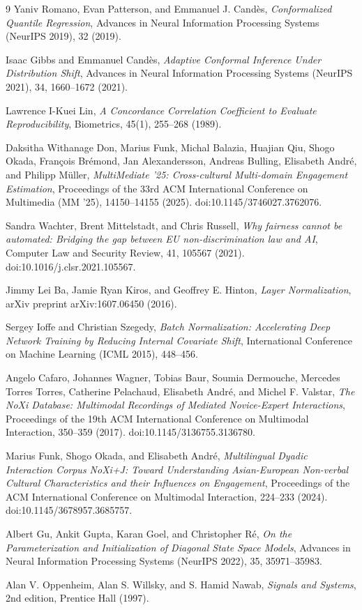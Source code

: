 \documentclass[11pt,a4paper]{article}
\begin{document}
\begin{thebibliography}{9}
		Yaniv Romano, Evan Patterson, and Emmanuel J. Candès, \emph{Conformalized Quantile Regression}, Advances in Neural Information Processing Systems (NeurIPS 2019), 32 (2019).
		
		Isaac Gibbs and Emmanuel Candès, \emph{Adaptive Conformal Inference Under Distribution Shift}, Advances in Neural Information Processing Systems (NeurIPS 2021), 34, 1660--1672 (2021).

		Lawrence I-Kuei Lin, \emph{A Concordance Correlation Coefficient to Evaluate Reproducibility}, Biometrics, 45(1), 255--268 (1989).
		
		Daksitha Withanage Don, Marius Funk, Michal Balazia, Huajian Qiu, Shogo Okada, Fran\c{c}ois Br\'{e}mond, Jan Alexandersson, Andreas Bulling, Elisabeth Andr\'{e}, and Philipp M\"{u}ller, \emph{MultiMediate '25: Cross-cultural Multi-domain Engagement Estimation}, Proceedings of the 33rd ACM International Conference on Multimedia (MM '25), 14150--14155 (2025). doi:10.1145/3746027.3762076.
		
		Sandra Wachter, Brent Mittelstadt, and Chris Russell, \emph{Why fairness cannot be automated: Bridging the gap between EU non-discrimination law and AI}, Computer Law and Security Review, 41, 105567 (2021). doi:10.1016/j.clsr.2021.105567.
		
		Jimmy Lei Ba, Jamie Ryan Kiros, and Geoffrey E. Hinton, \emph{Layer Normalization}, arXiv preprint arXiv:1607.06450 (2016).
		
		Sergey Ioffe and Christian Szegedy, \emph{Batch Normalization: Accelerating Deep Network Training by Reducing Internal Covariate Shift}, International Conference on Machine Learning (ICML 2015), 448--456.
		
		Angelo Cafaro, Johannes Wagner, Tobias Baur, Soumia Dermouche, Mercedes Torres Torres, Catherine Pelachaud, Elisabeth Andr\'{e}, and Michel F. Valstar, \emph{The NoXi Database: Multimodal Recordings of Mediated Novice-Expert Interactions}, Proceedings of the 19th ACM International Conference on Multimodal Interaction, 350--359 (2017). doi:10.1145/3136755.3136780.
		
		Marius Funk, Shogo Okada, and Elisabeth Andr\'{e}, \emph{Multilingual Dyadic Interaction Corpus NoXi+J: Toward Understanding Asian-European Non-verbal Cultural Characteristics and their Influences on Engagement}, Proceedings of the ACM International Conference on Multimodal Interaction, 224--233 (2024). doi:10.1145/3678957.3685757.

		 Albert Gu, Ankit Gupta, Karan Goel, and Christopher R\'{e}, \emph{On the Parameterization and Initialization of Diagonal State Space Models}, Advances in Neural Information Processing Systems (NeurIPS 2022), 35, 35971--35983.

		 Alan V. Oppenheim, Alan S. Willsky, and S. Hamid Nawab, \emph{Signals and Systems}, 2nd edition, Prentice Hall (1997).
	\end{thebibliography}
	
\end{document}
